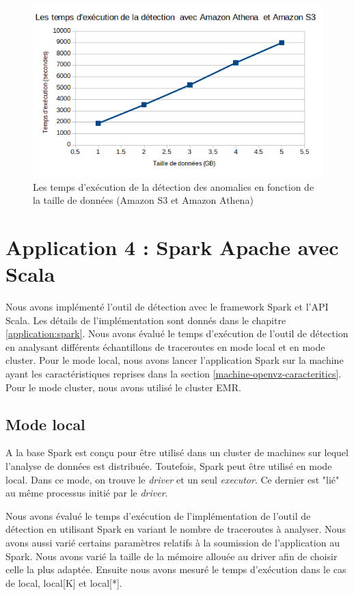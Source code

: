 \begin{figure}[H]
	\centering
	\captionsetup{justification=centering}
	\includegraphics[width=0.7\linewidth]{illustrations/temps-avec-aws_1}
	\caption{Les temps d'exécution de la détection des anomalies en fonction de la taille de données (Amazon S3 et Amazon Athena)}
	\label{fig:temps-avec-aws}
\end{figure}


\section{Application 4 : Spark Apache avec Scala}
Nous avons implémenté l'outil de détection avec le framework Spark et l'API Scala. Les détails de l'implémentation sont donnés dans le chapitre \ref{application:spark}.  Nous avons évalué le temps d'exécution de l'outil de détection en analysant différents échantillons de traceroutes  en mode local et en mode cluster. Pour le mode local, nous avons lancer l'application Spark sur la machine ayant les caractéristiques  reprises dans la section \ref{machine-openvz-caracteritics}. Pour le mode cluster, nous avons utilisé le cluster EMR.


\subsection{Mode local}

A la base Spark est conçu pour être utilisé dans un cluster de machines sur  lequel l'analyse de données est distribuée. Toutefois, Spark peut être utilisé en mode local. Dans ce mode, on trouve le \textit{driver} et un seul \textit{executor}. Ce dernier est "lié" au même processus initié par le \textit{driver}. 


Nous avons évalué le temps d'exécution de l'implémentation de l'outil de détection en utilisant Spark en variant le nombre de traceroutes à analyser. Nous avons aussi varié certains paramètres relatifs à la soumission de l'application au Spark. Nous avons varié la taille de la mémoire allouée au driver afin de choisir celle la plus adaptée. Ensuite nous avons mesuré le temps d'exécution dans le cas de local, local[K] et local[*].


